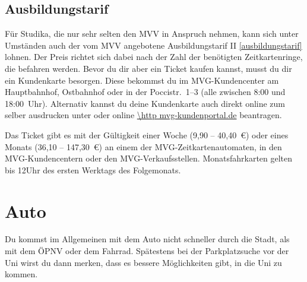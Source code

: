 \begin{urlList}
\end{urlList}

\subsection{Ausbildungstarif}
Für Studika, die nur sehr selten den MVV in Anspruch nehmen, kann sich unter Umständen auch der vom MVV angebotene Ausbildungstarif II \ref{ausbildungstarif} lohnen. Der Preis richtet sich dabei nach der Zahl der benötigten Zeitkartenringe, die befahren werden. Bevor du dir aber ein Ticket kaufen kannst, musst du dir ein Kundenkarte besorgen. Diese bekommst du im MVG-Kundencenter am Hauptbahnhof, Ostbahnhof oder in der Poccistr.~1--3 (alle zwischen 8:00 und 18:00~Uhr). Alternativ kannst du deine Kundenkarte auch direkt online zum selber ausdrucken unter oder online \url{\http mvg-kundenportal.de} beantragen.

Das Ticket gibt es mit der Gültigkeit einer Woche (9,90 -- 40,40~€) oder eines Monats (36,10 -- 147,30~€) an einem der MVG-Zeitkartenautomaten, in den MVG-Kundencentern oder den MVG-Verkaufsstellen. Monatsfahrkarten gelten bis 12Uhr des ersten Werktags des Folgemonats.

\begin{urlList}
\end{urlList}

\section{Auto}
Du kommst im Allgemeinen mit dem Auto nicht schneller durch die Stadt, als mit dem ÖPNV oder dem Fahrrad. Spätestens bei der Parkplatzsuche vor der Uni wirst du dann merken, dass es bessere Möglichkeiten gibt, in die Uni zu kommen.
